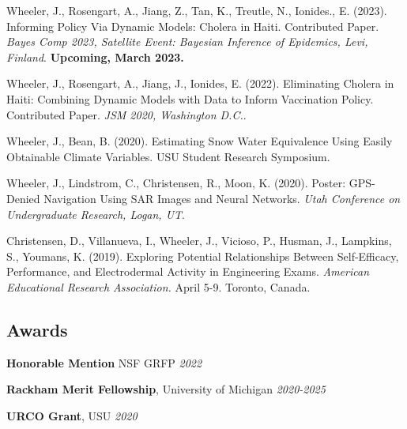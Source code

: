 \documentclass[11pt] {article}
\newenvironment {reflist}
                {
                 \begin{list}{}
                 {\setlength{\labelwidth}{0mm}
                  \setlength{\leftmargin}{8mm}
                  \setlength{\itemindent}{-3mm}
                  \setlength{\labelsep}{0mm}
                  \setlength{\parsep}{0.1 ex}
                  \setlength{\itemsep}{0.1cm}
      \setlength{\topsep}{0.15cm}}} %
   {\end{list}}
\begin{document}
\begin{reflist}

    \item Wheeler, J., Rosengart, A., Jiang, Z., Tan, K., Treutle, N., Ionides., E. (2023). Informing Policy Via Dynamic Models: Cholera in Haiti. Contributed Paper. {\it Bayes Comp 2023, Satellite Event: Bayesian Inference of Epidemics, Levi, Finland}. \textbf{Upcoming, March 2023.}

    \item Wheeler, J., Rosengart, A., Jiang, J., Ionides, E. (2022). Eliminating Cholera in Haiti: Combining Dynamic Models with Data to Inform Vaccination Policy. Contributed Paper. {\it JSM 2020, Washington D.C.}. 

    \item Wheeler, J., Bean, B. (2020). Estimating Snow Water Equivalence Using Easily Obtainable Climate Variables. USU Student Research Symposium. 

    \item Wheeler, J., Lindstrom, C., Christensen, R., Moon, K. (2020). Poster: GPS-Denied Navigation Using SAR Images and Neural Networks. {\it Utah Conference on Undergraduate Research, Logan, UT}.

    \item Christensen, D., Villanueva, I., Wheeler, J., Vicioso, P., Husman, J., Lampkins, S., Youmans, K. (2019). Exploring Potential Relationships Between Self-Efficacy, Performance, and Electrodermal Activity in Engineering Exams. {\it American Educational Research Association.} April 5-9. Toronto, Canada. 
    
\end{reflist}

\subsection*{Awards}

\noindent\hspace{5mm}\textbf{Honorable Mention} NSF GRFP \hfill {\textit{2022}}

\vspace{2mm}
\noindent\hspace{5mm}\textbf{Rackham Merit Fellowship}, University of Michigan \hfill {\textit{2020-2025}}

\vspace{2mm}
\noindent\hspace{5mm}\textbf{URCO Grant}, USU \hfill  {\textit{2020}}

\noindent\hspace{5mm}{\it Award amount: $\$1000$}
\end{document}
